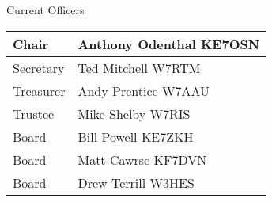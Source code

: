 \documentclass[letter,11pt]{extarticle}
\begin{document}
\begin{enumerate}
	\end{enumerate}


	Current Officers \\
	\begin{tabular}{|l|l|} \hline
		Chair & Anthony Odenthal KE7OSN \\ \hline
		Secretary & Ted Mitchell W7RTM \\ \hline
		Treasurer & Andy Prentice W7AAU \\ \hline
		Trustee & Mike Shelby W7RIS   \\ \hline
		Board & Bill Powell KE7ZKH \\ \hline
		Board & Matt Cawrse KF7DVN \\ \hline
		Board & Drew Terrill W3HES\\ \hline
	\end{tabular}
	
	\subsection*{}
	
\end{document}
